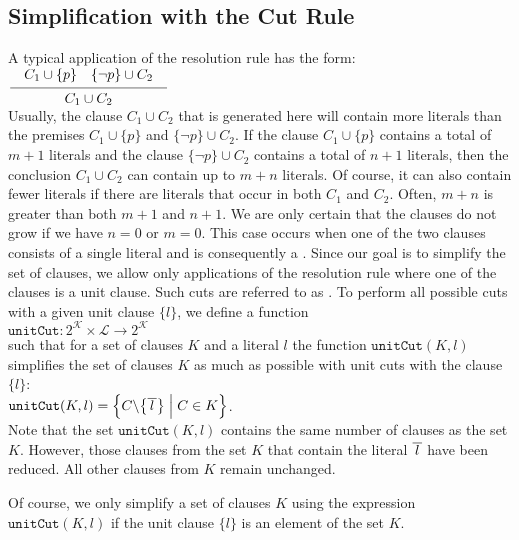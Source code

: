 \subsection{Simplification with the Cut Rule}
A typical application of the resolution rule has the form: \\[0.2cm]
\hspace*{1.3cm} $\schluss{ C_1 \cup \{p\} \quad \{\neg p\} \cup C_2}{C_1 \cup C_2}$
\\[0.2cm]
Usually, the clause $C_1 \cup C_2$ that is  generated here will contain more literals
than the premises $C_1 \cup \{p\}$ and $\{\neg p\} \cup C_2$. If the
clause $C_1 \cup \{p\}$ contains a total of $m+1$ literals and the clause
$\{\neg p\} \cup C_2$ contains a total of $n+1$ literals, then the conclusion $C_1 \cup C_2$
can contain up to $m + n$ literals. Of course, it can also contain fewer literals
if there are literals that occur in both $C_1$ and $C_2$.
Often, $m + n$ is greater than both $m + 1$ and $n + 1$.  We are only certain that the clauses
do not grow if we have $n = 0$ or $m = 0$.
This case occurs when one of the two clauses consists  of a single literal
and is consequently a .  Since our goal is to simplify the set of clauses,
we allow only applications of the resolution rule where
one of the clauses is a unit clause. Such cuts are referred to as
. To perform all possible cuts with a given unit clause $\{l\}$,
we define a function
\\[0.2cm]
\hspace*{1.3cm}
$\texttt{unitCut}: 2^\mathcal{K} \times \mathcal{L} \rightarrow 2^\mathcal{K}$
\\[0.2cm]
such that for a set of clauses $K$ and a literal $l$ the function
$\texttt{unitCut}(K,l)$ simplifies the set of clauses $K$ as much as possible with unit cuts with the clause
$\{l\}$:
\\[0.2cm]
\hspace*{1.3cm}
$\texttt{unitCut}(K,l) = \Bigl\{ C \backslash \bigl\{ \overline{\,l\,} \bigr\} \;\Big|\; C \in K \Bigr\}$.
\\[0.2cm]
Note that the set $\texttt{unitCut}(K,l)$ contains the same number of clauses as the set
$K$. However, those clauses from the set $K$ that contain the literal $\overline{\,l\,}$
have been reduced. All other clauses from $K$ remain unchanged.

Of course, we only simplify a set of clauses $K$ using the expression $\texttt{unitCut}(K, l)$ if
the unit clause $\{l\}$ is an element of the set $K$.


